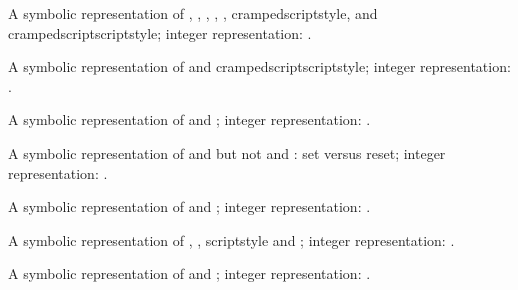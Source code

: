 \stopnewprimitive

\startnewprimitive[title={\prm {allmathstyles}}]

A symbolic representation of , ,
, , , \prm
{crampedscriptstyle},  and \prm
{crampedscriptscriptstyle}; integer representation: \the\allmathstyles.

\stopnewprimitive

\startnewprimitive[title={\prm {allscriptscriptstyles}}]

A symbolic representation of  and \prm
{crampedscriptscriptstyle}; integer representation: \the\allscriptscriptstyles.

\stopnewprimitive

\startnewprimitive[title={\prm {allscriptstyles}}]

A symbolic representation of  and ;
integer representation: \the\allscriptstyles.

\stopnewprimitive

\startnewprimitive[title={\prm {allsplitstyles}}]

A symbolic representation of  and  but not
 and : set versus reset; integer
representation: \the\allsplitstyles.

\stopnewprimitive

\startnewprimitive[title={\prm {alltextstyles}}]

A symbolic representation of  and ;
integer representation: \the\alltextstyles.

\stopnewprimitive

\startnewprimitive[title={\prm {alluncrampedstyles}}]

A symbolic representation of , , \prm
{scriptstyle} and ; integer representation:
\the\alluncrampedstyles.

\stopnewprimitive

\startnewprimitive[title={\prm {allunsplitstyles}}]

A symbolic representation of  and ; integer
representation: \the\allunsplitstyles.

\stopnewprimitive

\startnewprimitive[title={\prm {amcode}}]
\stopnewprimitive

